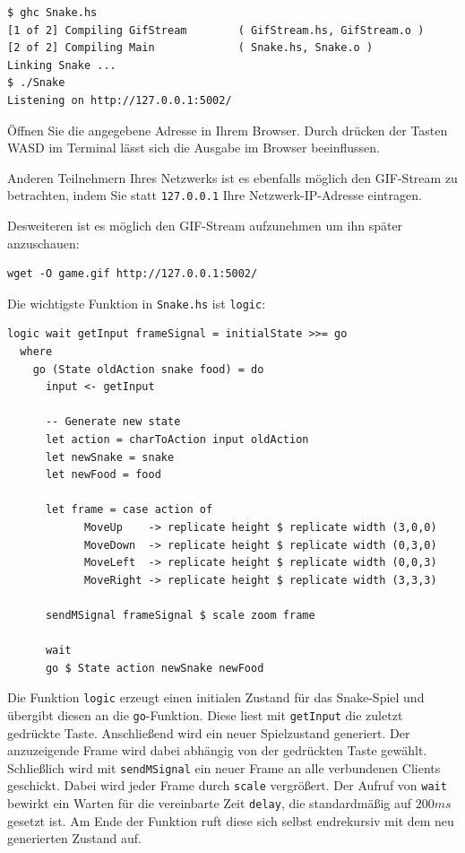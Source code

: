 \documentclass{scrartcl}
\begin{document}
\begin{lstlisting}
$ ghc Snake.hs
[1 of 2] Compiling GifStream        ( GifStream.hs, GifStream.o )
[2 of 2] Compiling Main             ( Snake.hs, Snake.o )
Linking Snake ...
$ ./Snake
Listening on http://127.0.0.1:5002/
\end{lstlisting}

Öffnen Sie die angegebene Adresse in Ihrem Browser.
Durch drücken der Tasten WASD im Terminal lässt sich die Ausgabe im Browser beeinflussen.

Anderen Teilnehmern Ihres Netzwerks ist es ebenfalls möglich den GIF-Stream zu betrachten, indem Sie statt \texttt{127.0.0.1} Ihre Netzwerk-IP-Adresse eintragen.

Desweiteren ist es möglich den GIF-Stream aufzunehmen um ihn später anzuschauen:

\begin{lstlisting}
wget -O game.gif http://127.0.0.1:5002/
\end{lstlisting}

Die wichtigste Funktion in \texttt{Snake.hs} ist \texttt{logic}:

\begin{lstlisting}
logic wait getInput frameSignal = initialState >>= go
  where
    go (State oldAction snake food) = do
      input <- getInput

      -- Generate new state
      let action = charToAction input oldAction
      let newSnake = snake
      let newFood = food

      let frame = case action of
            MoveUp    -> replicate height $ replicate width (3,0,0)
            MoveDown  -> replicate height $ replicate width (0,3,0)
            MoveLeft  -> replicate height $ replicate width (0,0,3)
            MoveRight -> replicate height $ replicate width (3,3,3)

      sendMSignal frameSignal $ scale zoom frame

      wait
      go $ State action newSnake newFood
\end{lstlisting}

Die Funktion \texttt{logic} erzeugt einen initialen Zustand für das Snake-Spiel und übergibt diesen an die \texttt{go}-Funktion.
Diese liest mit \texttt{getInput} die zuletzt gedrückte Taste.
Anschließend wird ein neuer Spielzustand generiert.
Der anzuzeigende Frame wird dabei abhängig von der gedrückten Taste gewählt.
Schließlich wird mit \texttt{sendMSignal} ein neuer Frame an alle verbundenen Clients geschickt.
Dabei wird jeder Frame durch \texttt{scale} vergrößert.
Der Aufruf von \texttt{wait} bewirkt ein Warten für die vereinbarte Zeit \texttt{delay}, die standardmäßig auf $200 ms$ gesetzt ist.
Am Ende der Funktion ruft diese sich selbst endrekursiv mit dem neu generierten Zustand auf.
\end{document}
